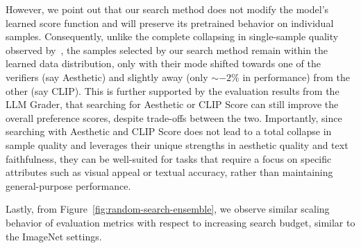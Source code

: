 However, we point out that our search method does not modify the model's learned score function and will preserve its pretrained behavior on individual samples. Consequently, unlike the complete collapsing in single-sample quality observed by~\citet{clark2024directly}, the samples selected by our search method remain within the learned data distribution, only with their mode shifted towards one of the verifiers (say Aesthetic) and slightly away (only $\sim-2\%$ in performance) from the other (say CLIP). This is further supported by the evaluation results from the LLM Grader, that searching for Aesthetic or CLIP Score can still improve the overall preference scores, despite trade-offs between the two. Importantly, since searching with Aesthetic and CLIP Score does not lead to a total collapse in sample quality and leverages their unique strengths in aesthetic quality and text faithfulness, they can be well-suited for tasks that require a focus on specific attributes such as visual appeal or textual accuracy, rather than maintaining general-purpose performance.


Lastly, from Figure~\ref{fig:random-search-ensemble}, we observe similar scaling behavior of evaluation metrics with respect to increasing search budget, similar to the ImageNet settings.


\begin{table}
\centering
{}
\caption{\footnotesize{\textbf{\emph{Performance of search with FLUX.1-dev on T2I-CompBench.}} We use random search with Verifier Ensemble to obtain the samples; for evaluation, we use the pipeline provided in T2I-CompBench. The first row denotes the performance without search where we fix the denoising budget to be $30$ NFEs, and for the rest, we fix the search budget to be $1920$ NFEs.}}
\label{tab:comp-bench}
\vspace{-0.5cm}
\end{table}


